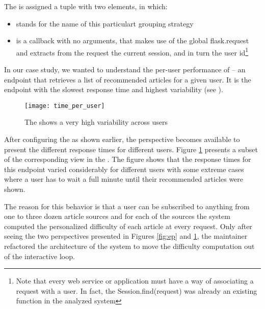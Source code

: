 The  is assigned a tuple with two elements, in which:  

\begin{itemize}
	\item {} stands for the name of this particulart grouping strategy
	\item {} is a callback with no arguments, 
	that makes use of the global flask.request and extracts from 
	the request the current session, and in turn the user id\footnote{
		Note that every web service or application must have a way of 
		associating a request with a user. In fact, the Session.find(request) 
		was already an existing function in the analyzed system}
\end{itemize}


In our case study, we wanted to understand the per-user performance of \epFeedItems 
--  an endpoint that retrieves a list of recommended articles for a given user.
It is the endpoint with the slowest response time and highest variability (see ). 


 

\begin{figure}[h!]
  \centering
  \texttt{[image: time\_per\_user]}
  \caption{The \epFeedItems shows a very high variability across users}
  \label{fig:tpu}
\end{figure}


After configuring the \tool as shown earlier, the  perspective becomes available to  present the different response times for different users. Figure \ref{fig:tpu} presents a subset of the corresponding view in the \tool. The figure shows that the response times for this endpoint varied considerably for different users with some extreme cases where a user has to wait a full minute until their recommended articles were shown. 

The reason for this behavior is that a user can be subscribed to anything from one to three dozen 
article sources and for each of the sources the system computed the personalized difficulty 
of each article at every request. Only after seeing the two perspectives presented in Figures \ref{fig:ep} and \ref{fig:tpu}, the maintainer refactored the architecture of the system to move the difficulty computation out of the interactive loop.






